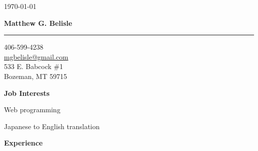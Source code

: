 \documentclass[11pt, a4paper]{article}
\begin{document}
\thispagestyle{empty}
\begin{flushright}
\small \today
\end{flushright}
\begin{center}
\textbf{\Large Matthew G. Belisle}
\rule{\linewidth}{0.5mm}
\end{center}
\begin{flushright}
\begin{minipage}[h]{0.25\linewidth}\small
\begin{flushleft}
406-599-4238\\
\href{mailto:mgbelisle@gmail.com}{mgbelisle@gmail.com}\\
533 E. Babcock \#1\\
Bozeman, MT 59715
\end{flushleft}
\end{minipage}
\end{flushright}
\textbf{Job Interests}
\begin{itemize*}
  \item Web programming
  \item Japanese to English translation
\end{itemize*}
\textbf{Experience}
\end{document}
